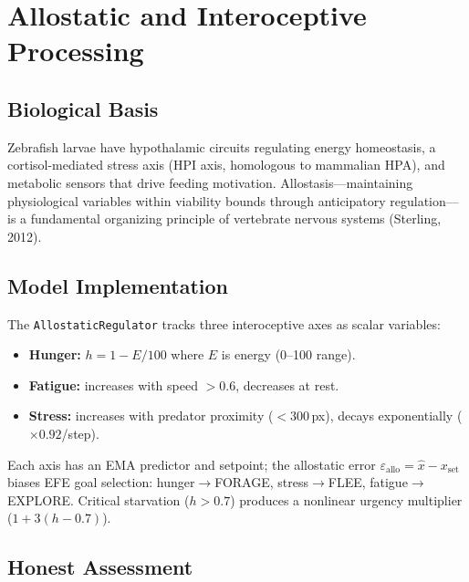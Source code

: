 \documentclass[11pt,a4paper]{article}
\begin{document}
\section{Allostatic and Interoceptive Processing}
\label{sec:allostasis}

\subsection{Biological Basis}

Zebrafish larvae have hypothalamic circuits regulating energy homeostasis,
a cortisol-mediated stress axis (HPI axis, homologous to mammalian HPA),
and metabolic sensors that drive feeding motivation.  Allostasis---maintaining
physiological variables within viability bounds through anticipatory regulation---is
a fundamental organizing principle of vertebrate nervous systems (Sterling, 2012).

\subsection{Model Implementation}

The \texttt{AllostaticRegulator} tracks three interoceptive axes as scalar variables:
\begin{itemize}[leftmargin=*]
\item \textbf{Hunger:} $h = 1 - E/100$ where $E$ is energy (0--100 range).
\item \textbf{Fatigue:} increases with speed $> 0.6$, decreases at rest.
\item \textbf{Stress:} increases with predator proximity ($< 300$\,px), decays
  exponentially ($\times 0.92$/step).
\end{itemize}
Each axis has an EMA predictor and setpoint; the allostatic error
$\varepsilon_\text{allo} = \hat{x} - x_\text{set}$ biases EFE goal selection:
hunger$\to$FORAGE, stress$\to$FLEE, fatigue$\to$EXPLORE.
Critical starvation ($h > 0.7$) produces a nonlinear urgency multiplier
($1 + 3(h - 0.7)$).

\subsection{Honest Assessment}
\end{document}

